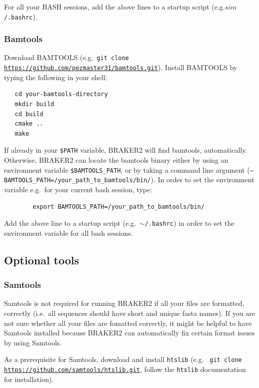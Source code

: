 \documentclass[a4paper,10pt]{report}
\begin{document}
    For all your BASH sessions, add the above lines to a startup script (e.g.\texttt{$sim$/.bashrc}).

   

\subsubsection{Bamtools}

Download BAMTOOLS (e.g.~\texttt{git clone \url{https://github.com/pezmaster31/bamtools.git}}). Install BAMTOOLS by typing the following in your shell:\\

 \begin{verbatim}
   cd your-bamtools-directory
   mkdir build
   cd build
   cmake ..
   make
 \end{verbatim}

 If already in your \texttt{\$PATH} variable, BRAKER2 will find bamtools, automatically. Otherwise, BRAKER2 can locate the bamtools binary either by using an environment variable \texttt{\$BAMTOOLS\_PATH}, or by taking a command line argument (\texttt{--BAMTOOLS\_PATH=/your\_path\_to\_bamtools/bin/}). In order to set the environment variable e.g.~for your current bash session, type:

    \begin{verbatim}
        export BAMTOOLS_PATH=/your_path_to_bamtools/bin/ 
    \end{verbatim} 

    Add the above line to a startup script (e.g.~\texttt{$\sim$/.bashrc}) in order to set the environment variable for all bash sessions.
    
\subsection{Optional tools}

\subsubsection{Samtools}

Samtools is not required for running BRAKER2 if all your files are formatted, correctly (i.e.~all sequences should have short and unique fasta names). If you are not sure
      whether all your files are fomatted correctly, it might be helpful to have Samtools
      installed because BRAKER2 can automatically fix certain format issues by using Samtools. 

      As a prerequisite for Samtools, download and install \texttt{htslib} (e.g.~ 
      \texttt{git clone \url{https://github.com/samtools/htslib.git}}, follow the \texttt{htslib} documentation for 
      installation).
\end{document}
